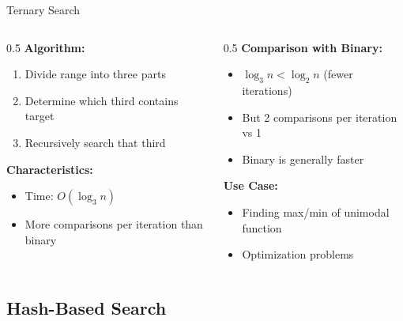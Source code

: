 \documentclass[aspectratio=169,xcolor=dvipsnames]{beamer}
\begin{document}
\begin{frame}{Ternary Search}
  \begin{columns}
    \begin{column}{0.5\textwidth}
      \textbf{Algorithm:}
      \begin{enumerate}
        \item Divide range into three parts
        \item Determine which third contains target
        \item Recursively search that third
      \end{enumerate}

      \vspace{0.3cm}
      \textbf{Characteristics:}
      \begin{itemize}
        \item Time: $O(\log_3 n)$
        \item More comparisons per iteration than binary
      \end{itemize}
    \end{column}

    \begin{column}{0.5\textwidth}
      \textbf{Comparison with Binary:}
      \begin{itemize}
        \item $\log_3 n < \log_2 n$ (fewer iterations)
        \item But 2 comparisons per iteration vs 1
        \item Binary is generally faster
      \end{itemize}

      \vspace{0.3cm}
      \textbf{Use Case:}
      \begin{itemize}
        \item Finding max/min of unimodal function
        \item Optimization problems
      \end{itemize}
    \end{column}
  \end{columns}
\end{frame}

\subsection{Hash-Based Search}
\end{document}
